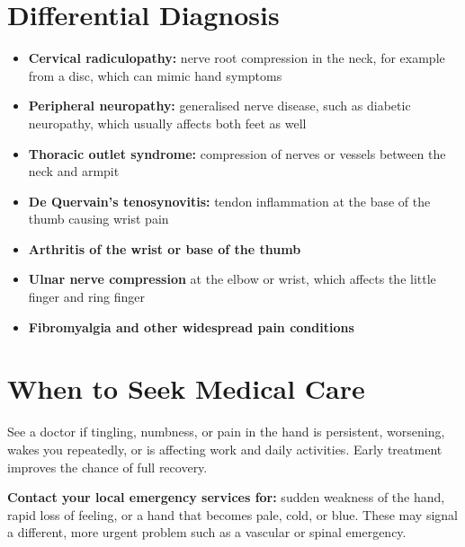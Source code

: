 \section*{Differential Diagnosis}
\begin{itemize}
    \item \textbf{Cervical radiculopathy:} nerve root compression in the neck, for example from a disc, which can mimic hand symptoms
    \item \textbf{Peripheral neuropathy:} generalised nerve disease, such as diabetic neuropathy, which usually affects both feet as well
    \item \textbf{Thoracic outlet syndrome:} compression of nerves or vessels between the neck and armpit
    \item \textbf{De Quervain's tenosynovitis:} tendon inflammation at the base of the thumb causing wrist pain
    \item \textbf{Arthritis of the wrist or base of the thumb}
    \item \textbf{Ulnar nerve compression} at the elbow or wrist, which affects the little finger and ring finger
    \item \textbf{Fibromyalgia and other widespread pain conditions}
\end{itemize}

\section*{When to Seek Medical Care}
See a doctor if tingling, numbness, or pain in the hand is persistent, worsening, wakes you repeatedly, or is affecting work and daily activities. Early treatment improves the chance of full recovery.

\textbf{Contact your local emergency services for:} sudden weakness of the hand, rapid loss of feeling, or a hand that becomes pale, cold, or blue. These may signal a different, more urgent problem such as a vascular or spinal emergency.

